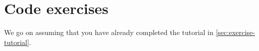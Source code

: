 \section{Code exercises}

We go on assuming that you have already completed the tutorial in \cref{sec:exercise-tutorial}.
